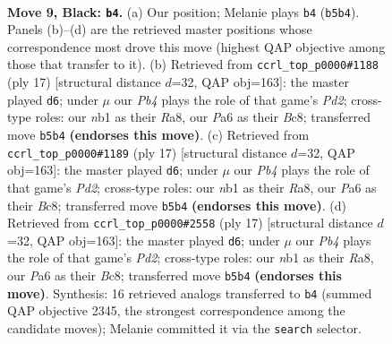 \documentclass[11pt]{article}
\begin{document}
\begin{figure}[p]\centering
\begin{subfigure}{0.46\textwidth}\centering
\resizebox{\linewidth}{!}{%
\newchessgame
\chessboard[
  setfen={r1bq1rk1/2p1bppp/p1np1n2/1p2p3/3PP2P/1B3N2/PPP2PP1/RNBQR1K1 b - - 0 9},
  showmover=false,
  pgfstyle=straightmove, color=movearrow, markmove={b5-b4}
]}
\caption{}
\end{subfigure}\hfill
\begin{subfigure}{0.46\textwidth}\centering
\resizebox{\linewidth}{!}{%
\newchessgame
\chessboard[
  setfen={r1bq1rk1/2ppbppp/p1n2n2/4p3/Pp1PP3/1B3N2/1PP2PPP/RNBQR1K1 b - - 0 9},
  showmover=false,
  pgfstyle=straightmove, color=movearrow, markmove={d7-d6}
]}
\caption{}
\end{subfigure}
\\[4pt]
\begin{subfigure}{0.46\textwidth}\centering
\resizebox{\linewidth}{!}{%
\newchessgame
\chessboard[
  setfen={r1bq1rk1/2ppbppp/p1n2n2/4p3/Pp1PP3/1B3N2/1PP2PPP/RNBQR1K1 b - - 0 9},
  showmover=false,
  pgfstyle=straightmove, color=movearrow, markmove={d7-d6}
]}
\caption{}
\end{subfigure}\hfill
\begin{subfigure}{0.46\textwidth}\centering
\resizebox{\linewidth}{!}{%
\newchessgame
\chessboard[
  setfen={r1bq1rk1/2ppbppp/p1n2n2/4p3/Pp1PP3/1B3N2/1PP2PPP/RNBQR1K1 b - - 0 9},
  showmover=false,
  pgfstyle=straightmove, color=movearrow, markmove={d7-d6}
]}
\caption{}
\end{subfigure}
\caption{\textbf{Move 9, Black: \texttt{b4}.} (a) Our position; Melanie plays \texttt{b4} (\texttt{b5b4}). Panels (b)--(d) are the retrieved master positions whose correspondence most drove this move (highest QAP objective among those that transfer to it). (b) Retrieved from \texttt{ccrl\_top\_p0000\#1188} (ply 17) [structural distance $d$=32, QAP obj=163]: the master played \texttt{d6}; under $\mu$ our \emph{Pb4} plays the role of that game's \emph{Pd2}; cross-type roles: our \emph{n}b1 as their \emph{R}a8, our \emph{P}a6 as their \emph{B}c8; transferred move \texttt{b5b4} \textbf{(endorses this move)}. (c) Retrieved from \texttt{ccrl\_top\_p0000\#1189} (ply 17) [structural distance $d$=32, QAP obj=163]: the master played \texttt{d6}; under $\mu$ our \emph{Pb4} plays the role of that game's \emph{Pd2}; cross-type roles: our \emph{n}b1 as their \emph{R}a8, our \emph{P}a6 as their \emph{B}c8; transferred move \texttt{b5b4} \textbf{(endorses this move)}. (d) Retrieved from \texttt{ccrl\_top\_p0000\#2558} (ply 17) [structural distance $d$=32, QAP obj=163]: the master played \texttt{d6}; under $\mu$ our \emph{Pb4} plays the role of that game's \emph{Pd2}; cross-type roles: our \emph{n}b1 as their \emph{R}a8, our \emph{P}a6 as their \emph{B}c8; transferred move \texttt{b5b4} \textbf{(endorses this move)}. Synthesis: 16 retrieved analogs transferred to \texttt{b4} (summed QAP objective 2345, the strongest correspondence among the candidate moves); Melanie committed it via the \texttt{search} selector.}
\label{fig:thought-m17}
\end{figure}
\end{document}
